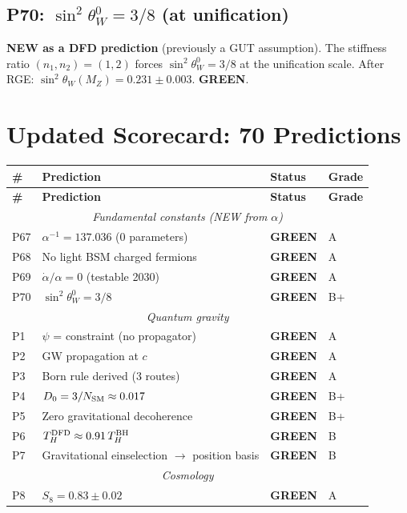 \documentclass[11pt,a4paper]{article}
\newcommand{\GREEN}{\textcolor{dfdgreen}{\textbf{GREEN}}}
\begin{document}
\subsection{P70: $\sin^2\theta_W^0 = 3/8$ (at unification)}

\textbf{NEW as a DFD prediction} (previously a GUT assumption). The stiffness ratio $(n_1, n_2) = (1, 2)$ forces $\sin^2\theta_W^0 = 3/8$ at the unification scale. After RGE: $\sin^2\theta_W(M_Z) = 0.231 \pm 0.003$. \GREEN{}.

\section{Updated Scorecard: 70 Predictions}

\begin{longtable}{llll}
\toprule
\textbf{\#} & \textbf{Prediction} & \textbf{Status} & \textbf{Grade} \\
\midrule
\endfirsthead
\toprule
\textbf{\#} & \textbf{Prediction} & \textbf{Status} & \textbf{Grade} \\
\midrule
\endhead
\multicolumn{4}{c}{\textit{Fundamental constants (NEW from $\alpha$)}} \\
\midrule
P67 & $\alpha^{-1} = 137.036$ (0 parameters) & \GREEN{} & A \\
P68 & No light BSM charged fermions & \GREEN{} & A \\
P69 & $\dot{\alpha}/\alpha = 0$ (testable 2030) & \GREEN{} & A \\
P70 & $\sin^2\theta_W^0 = 3/8$ & \GREEN{} & B+ \\
\midrule
\multicolumn{4}{c}{\textit{Quantum gravity}} \\
\midrule
P1 & $\psi$ = constraint (no propagator) & \GREEN{} & A \\
P2 & GW propagation at $c$ & \GREEN{} & A \\
P3 & Born rule derived (3 routes) & \GREEN{} & A \\
P4 & $D_0 = 3/N_{\rm SM} \approx 0.017$ & \GREEN{} & B+ \\
P5 & Zero gravitational decoherence & \GREEN{} & B+ \\
P6 & $T_H^{\rm DFD} \approx 0.91\,T_H^{\rm BH}$ & \GREEN{} & B \\
P7 & Gravitational einselection $\to$ position basis & \GREEN{} & B \\
\midrule
\multicolumn{4}{c}{\textit{Cosmology}} \\
\midrule
P8 & $S_8 = 0.83 \pm 0.02$ & \GREEN{} & A \\

\end{longtable}
\end{document}
